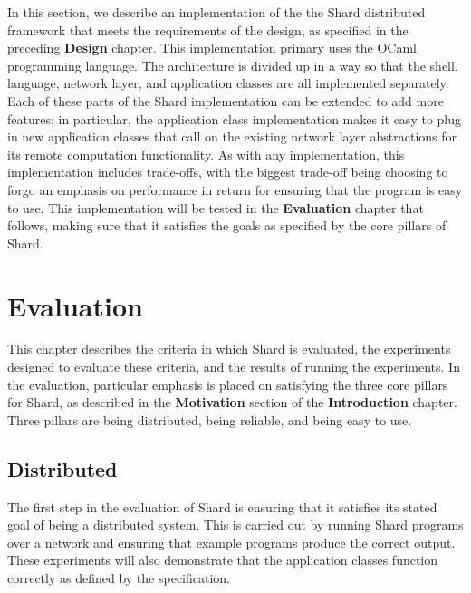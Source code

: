 \documentclass[twoside]{report}
\begin{document}
In this section, we describe an implementation of the the Shard distributed framework that meets the requirements of the design, as specified in the preceding \textbf{Design} chapter.
This implementation primary uses the OCaml programming language.
The architecture is divided up in a way so that the shell, language, network layer, and application classes are all implemented separately.
Each of these parts of the Shard implementation can be extended to add more features; in particular, the application class implementation makes it easy to plug in new application classes that call on the existing network layer abstractions for its remote computation functionality.
As with any implementation, this implementation includes trade-offs, with the biggest trade-off being choosing to forgo an emphasis on performance in return for ensuring that the program is easy to use.
This implementation will be tested in the \textbf{Evaluation} chapter that follows, making sure that it satisfies the goals as specified by the core pillars of Shard.


\chapter{Evaluation}

This chapter describes the criteria in which Shard is evaluated, the experiments designed to evaluate these criteria, and the results of running the experiments.
In the evaluation, particular emphasis is placed on satisfying the three core pillars for Shard, as described in the \textbf{Motivation} section of the \textbf{Introduction} chapter.
Three pillars are being distributed, being reliable, and being easy to use.

\section{Distributed}

The first step in the evaluation of Shard is ensuring that it satisfies its stated goal of being a distributed system.
This is carried out by running Shard programs over a network and ensuring that example programs produce the correct output.
These experiments will also demonstrate that the application classes function correctly as defined by the specification.
\end{document}

